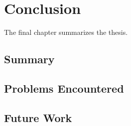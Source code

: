\chapter{Conclusion\label{cha:conclusion}}
The final chapter summarizes the thesis. 

\section{Summary\label{sec:summary}}

\section{Problems Encountered\label{sec:problems}}


\section{Future Work\label{sec:futurework}}

